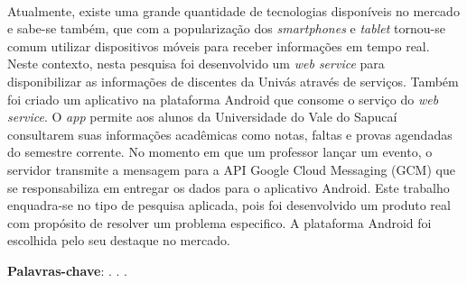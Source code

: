 
\begin{OnehalfSpacing} 


\vspace{\onelineskip}
\vspace{\onelineskip}
\vspace{\onelineskip}
\vspace{\onelineskip}

\begin{resumo}
~\\
\noindent Atualmente, existe uma grande quantidade de tecnologias disponíveis
no mercado e sabe-se também, que com a popularização dos \textit{smartphones} e
\textit{tablet} tornou-se comum utilizar dispositivos móveis para receber
informações em tempo real. Neste contexto, nesta pesquisa foi desenvolvido um
\textit{web service} para disponibilizar as informações de discentes da Univás
através de serviços. Também foi criado um aplicativo na plataforma Android que
consome o serviço do \textit{web service}. O \textit{app} permite aos alunos da
Universidade do Vale do Sapucaí consultarem suas informações acadêmicas como
notas, faltas e provas agendadas do semestre corrente. No momento em que um
professor lançar um evento, o servidor transmite a mensagem para a API Google
Cloud Messaging (GCM) que se responsabiliza em entregar os dados para o
aplicativo Android. Este trabalho enquadra-se no tipo de pesquisa aplicada,
pois foi desenvolvido um produto real com propósito de resolver um problema
especifico. A plataforma Android foi escolhida pelo seu destaque no mercado.

\vspace{\onelineskip}
\vspace*{\fill}
\noindent \textbf{Palavras-chave}: \imprimirPalavraChaveUm. \imprimirPalavraChaveDois. \imprimirPalavraChaveTres.
\vspace{\onelineskip}
\end{resumo}

\end{OnehalfSpacing}
